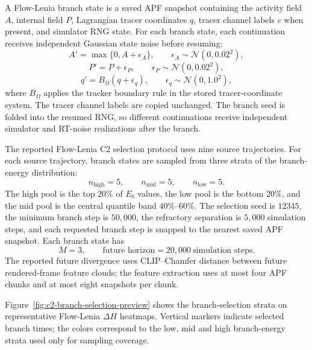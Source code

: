 A Flow-Lenia branch state is a saved APF snapshot containing the activity field $A$, internal field $P$, Lagrangian tracer coordinates $q$, tracer channel labels $c$ when present, and simulator RNG state.  For each branch state, each continuation receives independent Gaussian state noise before resuming:
\[
  A'=\max\{0,A+\epsilon_A\},
  \qquad
  \epsilon_A\sim \mathcal N(0,0.02^2),
\]
\[
  P'=P+\epsilon_P,
  \qquad
  \epsilon_P\sim \mathcal N(0,0.02^2),
\]
\[
  q'=B_\Omega(q+\epsilon_q),
  \qquad
  \epsilon_q\sim \mathcal N(0,1.0^2),
\]
where $B_\Omega$ applies the tracker boundary rule in the stored tracer-coordinate system.  The tracer channel labels are copied unchanged.  The branch seed is folded into the resumed RNG, so different continuations receive independent simulator and RT-noise realizations after the branch.

The reported Flow-Lenia C2 selection protocol uses nine source trajectories.  For each source trajectory, branch states are sampled from three strata of the branch-energy distribution:
\[
  n_{\mathrm{high}}=5,\qquad n_{\mathrm{mid}}=5,\qquad n_{\mathrm{low}}=5.
\]
The high pool is the top $20\%$ of $E_b$ values, the low pool is the bottom $20\%$, and the mid pool is the central quantile band $40\%$--$60\%$.  The selection seed is $12345$, the minimum branch step is $50{,}000$, the refractory separation is $5{,}000$ simulation steps, and each requested branch step is snapped to the nearest saved APF snapshot.  Each branch state has
\[
  M=3,\qquad
  \text{future horizon}=20{,}000\ \text{simulation steps}.
\]
The reported future divergence uses CLIP--Chamfer distance between future rendered-frame feature clouds; the feature extraction uses at most four APF chunks and at most eight snapshots per chunk.

Figure~\ref{fig:c2-branch-selection-preview} shows the branch-selection strata on representative Flow-Lenia $\Delta H$ heatmaps.  Vertical markers indicate selected branch times; the colors correspond to the low, mid and high branch-energy strata used only for sampling coverage.


